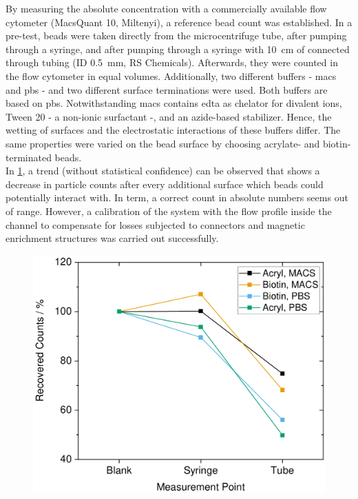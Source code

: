 By measuring the absolute concentration with a commercially available flow cytometer (MacsQuant 10, Miltenyi), a reference bead count was established. In a pre-test, beads were taken directly from the microcentrifuge tube, after pumping through a syringe, and after pumping through a syringe with \SI{10}{\centi\meter} of connected through tubing (ID \SI{0.5}{\milli\meter}, RS Chemicals). Afterwards, they were counted in the flow cytometer in equal volumes. Additionally, two different buffers - \gls{macs} and \gls{pbs} - and two different surface terminations were used. Both buffers are based on \acrfull{pbs}. Notwithstanding \gls{macs} contains \gls{edta} as chelator for divalent ions, Tween 20 - a non-ionic surfactant -, and an azide-based stabilizer. Hence, the wetting of surfaces and the electrostatic interactions of these buffers differ. The same properties were varied on the bead surface by choosing acrylate- and biotin-terminated beads.\\
In \cref{fig:conc:losses_syringe}, a trend (without statistical confidence) can be observed that shows a decrease in particle counts after every additional surface which beads could potentially interact with. In term, a correct count in absolute numbers seems out of range. However, a calibration of the system with the flow profile inside the channel to compensate for losses subjected to connectors and magnetic enrichment structures was carried out successfully.
\begin{figure}[b]
	\centering
	\includegraphics[width=.7\linewidth]{Ressources/Concentration/Losses-Syringe-Tubing}
	\label{fig:conc:losses_syringe}
\end{figure}


